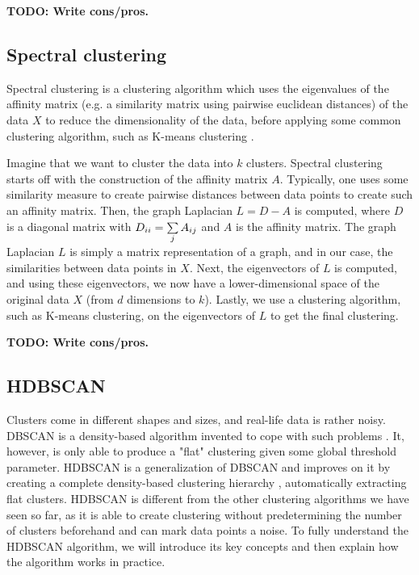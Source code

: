 \textbf{TODO: Write cons/pros.}

\subsection{Spectral clustering}
Spectral clustering is a clustering algorithm which uses the eigenvalues of the affinity matrix (e.g. a similarity matrix using pairwise euclidean distances) of the data $X$ to reduce the dimensionality of the data, before applying some common clustering algorithm, such as K-means clustering \cite{Andrew2002}.

Imagine that we want to cluster the data into $k$ clusters. Spectral clustering starts off with the construction of the affinity matrix $A$. Typically, one uses some similarity measure to create pairwise distances between data points to create such an affinity matrix. Then, the graph Laplacian $L = D - A$ is computed, where $D$ is a diagonal matrix with $D_{ii} = \sum\limits_{j}^{} A_{ij}$ and $A$ is the affinity matrix. The graph Laplacian $L$ is simply a matrix representation of a graph, and in our case, the similarities between data points in $X$. Next, the eigenvectors of $L$ is computed, and using these eigenvectors, we now have a lower-dimensional space of the original data $X$ (from $d$ dimensions to $k$). Lastly, we use a clustering algorithm, such as K-means clustering, on the eigenvectors of $L$ to get the final clustering.

\textbf{TODO: Write cons/pros.}

\subsection{HDBSCAN}
Clusters come in different shapes and sizes, and real-life data is rather noisy. DBSCAN is a density-based algorithm invented to cope with such problems \cite{Ester1996}. It, however, is only able to produce a "flat" clustering given some global threshold parameter. HDBSCAN is a generalization of DBSCAN and improves on it by creating a complete density-based clustering hierarchy \cite{Campello2013}, automatically extracting flat clusters. HDBSCAN is different from the other clustering algorithms we have seen so far, as it is able to create clustering without predetermining the number of clusters beforehand and can mark data points a noise. To fully understand the HDBSCAN algorithm, we will introduce its key concepts and then explain how the algorithm works in practice.


